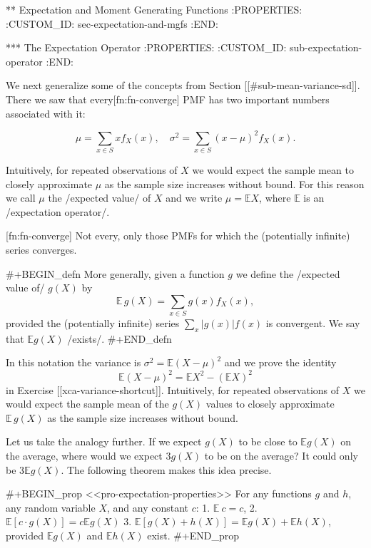 ** Expectation and Moment Generating Functions
:PROPERTIES:
:CUSTOM_ID: sec-expectation-and-mgfs
:END:

*** The Expectation Operator
:PROPERTIES:
:CUSTOM_ID: sub-expectation-operator
:END:

We next generalize some of the concepts from Section
[[#sub-mean-variance-sd]]. There we saw that every[fn:fn-converge] PMF has
two important numbers associated with it:

\begin{equation}
\mu = \sum_{x \in S}x f_{X}(x),\quad \sigma^{2} = \sum_{x \in S}(x - \mu)^{2} f_{X}(x).
\end{equation}

Intuitively, for repeated observations of \(X\) we would expect the
sample mean to closely approximate \(\mu\) as the sample size
increases without bound. For this reason we call \(\mu\) the /expected
value/ of \(X\) and we write \(\mu=\mathbb{E} X\), where
\(\mathbb{E}\) is an /expectation operator/.

[fn:fn-converge] Not every, only those PMFs for which the (potentially infinite) series converges.

#+BEGIN_defn
More generally, given a function \(g\) we define the /expected value
of/ \(g(X)\) by
\begin{equation}
\mathbb{E}\, g(X)=\sum_{x\in S}g(x)f_{X}(x),
\end{equation}
provided the (potentially infinite) series \(\sum_{x} \vert g(x) \vert f(x)\) is
convergent. We say that \(\mathbb{E} g(X)\) /exists/.
#+END_defn

In this notation the variance is \(\sigma^{2} = \mathbb{E}(X -
\mu)^{2}\) and we prove the identity
\begin{equation}
\mathbb{E}(X - \mu)^{2} = \mathbb{E} X^{2} - (\mathbb{E} X)^{2}
\end{equation}
in Exercise [[xca-variance-shortcut]]. Intuitively, for repeated observations
of \(X\) we would expect the sample mean of the \(g(X)\) values to
closely approximate \(\mathbb{E}\, g(X)\) as the sample size increases
without bound.

Let us take the analogy further. If we expect \(g(X)\) to be close to
\(\mathbb{E} g(X)\) on the average, where would we expect \(3g(X)\) to
be on the average? It could only be \(3\mathbb{E} g(X)\). The
following theorem makes this idea precise.

#+BEGIN_prop
<<pro-expectation-properties>> For any functions \(g\) and \(h\), any
random variable \(X\), and any constant \(c\):
1. \(\mathbb{E}\: c=c\),
2. \(\mathbb{E}[c\cdot g(X)]=c\mathbb{E} g(X)\)
3. \(\mathbb{E}[g(X)+h(X)]=\mathbb{E} g(X)+\mathbb{E} h(X)\), provided
   \(\mathbb{E} g(X)\) and \(\mathbb{E} h(X)\) exist.
#+END_prop

